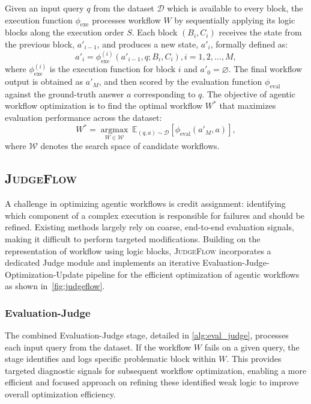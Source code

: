 \documentclass{article}
\theoremstyle{plain}
\theoremstyle{definition}
\theoremstyle{remark}
\def \our{\textsc{JudgeFlow}}
\begin{document}
Given an input query $q$ from the dataset $\mathcal{D}$ which is available to every block, the execution function $\phi_{\text{exe}}$ processes workflow $W$ by sequentially applying its logic blocks along the execution order $S$. Each block $(B_i, C_i)$ receives the state from the previous block, $a'_{i-1}$, and produces a new state, $a'_i$, formally defined as:
\begin{equation}
a'_i = \phi_{\text{exe}}^{(i)}(a'_{i-1}, q; B_i, C_i), i=1, 2,\ldots,M,
\end{equation}
where $\phi_{\text{exe}}^{(i)}$ is the execution function for block $i$ and $a'_0=\varnothing$. The final workflow output is obtained as $a'_M$, and then scored by the evaluation function $\phi_{\text{eval}}$ against the ground-truth answer $a$ corresponding to $q$. The objective of agentic workflow optimization is to find the optimal workflow $W^*$ that maximizes evaluation performance across the dataset:
\begin{equation}
W^* = \underset{W \in \mathcal{W}}{\operatorname{argmax}}\ \mathbb{E}_{(q, a) \sim \mathcal{D}} \left[ \phi_{\text{eval}} \left( a'_M, a \right) \right],
\end{equation}
where $\mathcal{W}$ denotes the search space of candidate workflows.



\subsection{\our{}}

A challenge in optimizing agentic workflows is credit assignment: identifying which component of a complex execution is responsible for failures and should be refined. Existing methods largely rely on coarse, end-to-end evaluation signals, making it difficult to perform targeted modifications. Building on the representation of workflow using logic blocks, \our{} incorporates a dedicated Judge module and implements an iterative Evaluation-Judge-Optimization-Update pipeline for the efficient optimization of agentic workflows as shown in~\cref{fig:judgeflow}.

\subsubsection{Evaluation-Judge}
The combined Evaluation-Judge stage, detailed in \cref{alg:eval_judge}, processes each input query from the dataset. If the workflow $W$ fails on a given query, the stage identifies and logs specific problematic block within $W$. This provides targeted diagnostic signals for subsequent workflow optimization, enabling a more efficient and focused approach on refining these identified weak logic to improve overall optimization efficiency.
\end{document}
